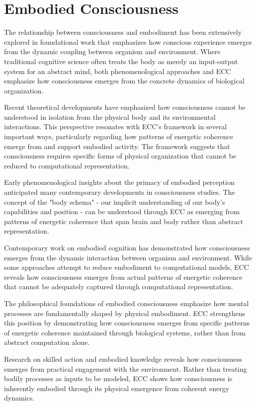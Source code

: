 \section{Embodied Consciousness}

The relationship between consciousness and embodiment has been extensively explored in foundational work \cite{Varela1991, MerleauPonty1962} that emphasizes how conscious experience emerges from the dynamic coupling between organism and environment. Where traditional cognitive science often treats the body as merely an input-output system for an abstract mind, both phenomenological approaches and ECC emphasize how consciousness emerges from the concrete dynamics of biological organization.

Recent theoretical developments \cite{Thompson2007} have emphasized how consciousness cannot be understood in isolation from the physical body and its environmental interactions. This perspective resonates with ECC's framework in several important ways, particularly regarding how patterns of energetic coherence emerge from and support embodied activity. The framework suggests that consciousness requires specific forms of physical organization that cannot be reduced to computational representation.

Early phenomenological insights \cite{MerleauPonty1962} about the primacy of embodied perception anticipated many contemporary developments in consciousness studies. The concept of the "body schema" - our implicit understanding of our body's capabilities and position - can be understood through ECC as emerging from patterns of energetic coherence that span brain and body rather than abstract representation.

Contemporary work on embodied cognition \cite{Clark1997} has demonstrated how consciousness emerges from the dynamic interaction between organism and environment. While some approaches attempt to reduce embodiment to computational models, ECC reveals how consciousness emerges from actual patterns of energetic coherence that cannot be adequately captured through computational representation.

The philosophical foundations of embodied consciousness \cite{Lakoff1999} emphasize how mental processes are fundamentally shaped by physical embodiment. ECC strengthens this position by demonstrating how consciousness emerges from specific patterns of energetic coherence maintained through biological systems, rather than from abstract computation alone.

Research on skilled action and embodied knowledge \cite{Ingold2000} reveals how consciousness emerges from practical engagement with the environment. Rather than treating bodily processes as inputs to be modeled, ECC shows how consciousness is inherently embodied through its physical emergence from coherent energy dynamics.

